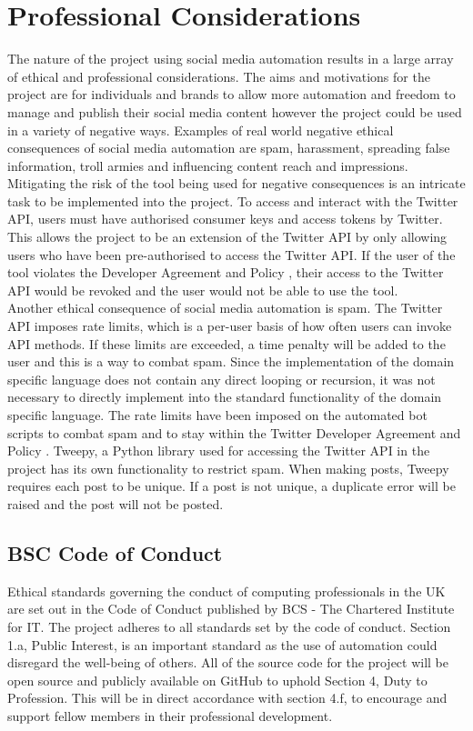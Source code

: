\chapter{Professional Considerations}

The nature of the project using social media automation results in a large array of ethical and professional considerations. The aims and motivations for the project are for individuals and brands to allow more automation and freedom to manage and publish their social media content however the project could be used in a variety of negative ways. Examples of real world negative ethical consequences of social media automation are spam, harassment, spreading false information, troll armies and influencing content reach and impressions. \\

Mitigating the risk of the tool being used for negative consequences is an intricate task to be implemented into the project. To access and interact with the Twitter API, users must have authorised consumer keys and access tokens by Twitter. This allows the project to be an extension of the Twitter API by only allowing users who have been pre-authorised to access the Twitter API. If the user of the tool violates the Developer Agreement and Policy \cite{DeveloperPolicy}, their access to the Twitter API would be revoked and the user would not be able to use the tool. \\

Another ethical consequence of social media automation is spam. The Twitter API imposes rate limits, which is a per-user basis of how often users can invoke API methods. If these limits are exceeded, a time penalty will be added to the user and this is a way to combat spam. Since the implementation of the domain specific language does not contain any direct looping or recursion, it was not necessary to directly implement into the standard functionality of the domain specific language. The rate limits have been imposed on the automated bot scripts to combat spam and to stay within the Twitter Developer Agreement and Policy \cite{DeveloperPolicy}. Tweepy, a Python library used for accessing the Twitter API in the project has its own functionality to restrict spam. When making posts, Tweepy requires each post to be unique. If a post is not unique, a duplicate error will be raised and the post will not be posted.

\section{BSC Code of Conduct}

Ethical standards governing the conduct of computing professionals in the UK are set out in the Code of Conduct published by BCS - The Chartered Institute for IT. The project adheres to all standards set by the code of conduct. Section 1.a, Public Interest, is an important standard as the use of automation could disregard the well-being of others. All of the source code for the project will be open source and publicly available on GitHub to uphold Section 4, Duty to Profession. This will be in direct accordance with section 4.f, to encourage and support fellow members in their professional development.
